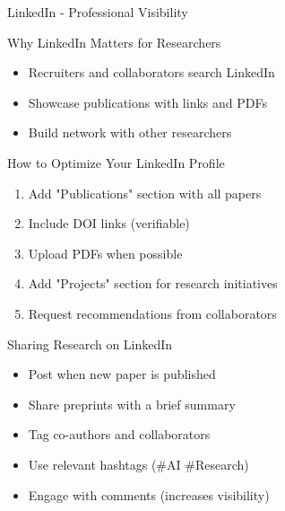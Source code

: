 \documentclass[11pt]{beamer}
\begin{document}
				\begin{frame}{LinkedIn - Professional Visibility}
					\scriptsize
					\begin{block}{Why LinkedIn Matters for Researchers}
						\begin{itemize}
							\item Recruiters and collaborators search LinkedIn
							\item Showcase publications with links and PDFs
							\item Build network with other researchers
						\end{itemize}
					\end{block}
					\begin{block}{How to Optimize Your LinkedIn Profile}
						\begin{enumerate}
							\item Add "Publications" section with all papers
							\item Include DOI links (verifiable)
							\item Upload PDFs when possible
							\item Add "Projects" section for research initiatives
							\item Request recommendations from collaborators
						\end{enumerate}
					\end{block}
					\begin{block}{Sharing Research on LinkedIn}
						\begin{itemize}
							\item Post when new paper is published
							\item Share preprints with a brief summary
							\item Tag co-authors and collaborators
							\item Use relevant hashtags (#AI #Research)
							\item Engage with comments (increases visibility)
						\end{itemize}
					\end{block}
				\end{frame}
				
\end{document}
